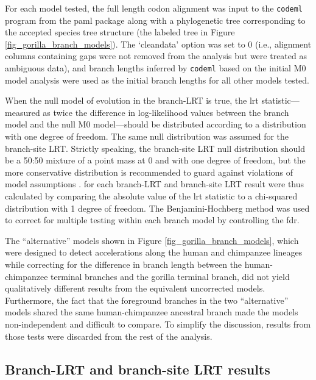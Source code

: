 For each model tested, the full length codon alignment was input to
the \texttt{codeml} program from the \ac{paml} package along with a
phylogenetic tree corresponding to the accepted species tree structure
(the labeled tree in Figure \ref{fig_gorilla_branch_models}). The
`cleandata' option was set to 0 (i.e., alignment columns containing
gaps were not removed from the analysis but were treated as ambiguous
data), and branch lengths inferred by \texttt{codeml} based on the
initial M0 model analysis were used as the initial branch lengths for
all other models tested.

When the null model of evolution in the branch-LRT is true, the
\ac{lrt} statistic---measured as twice the difference in
log-likelihood values between the branch model and the null M0
model---should be distributed according to a \chisq distribution with
one degree of freedom. The same null distribution was assumed for the
branch-site LRT. Strictly speaking, the branch-site LRT null
distribution should be a 50:50 mixture of a point mass at 0 and \chisq
with one degree of freedom, but the more conservative \chisq
distribution is recommended to guard against violations of model
assumptions \citep{Yang2007}. \pvs for each branch-LRT and branch-site
LRT result were thus calculated by comparing the absolute value of the
\ac{lrt} statistic to a chi-squared distribution with 1 degree of
freedom. The Benjamini-Hochberg method \citep{Benjamini1995} was used
to correct for multiple testing within each branch model by
controlling the \ac{fdr}.

The ``alternative'' models shown in Figure
\ref{fig_gorilla_branch_models}, which were designed to detect
accelerations along the human and chimpanzee lineages while correcting
for the difference in branch length between the human-chimpanzee
terminal branches and the gorilla terminal branch, did not yield
qualitatively different results from the equivalent uncorrected
models. Furthermore, the fact that the foreground branches in the two
``alternative'' models shared the same human-chimpanzee ancestral
branch made the models non-independent and difficult to compare. To
simplify the discussion, results from those tests were discarded from
the rest of the analysis.

\subsection{Branch-LRT and branch-site LRT results}

